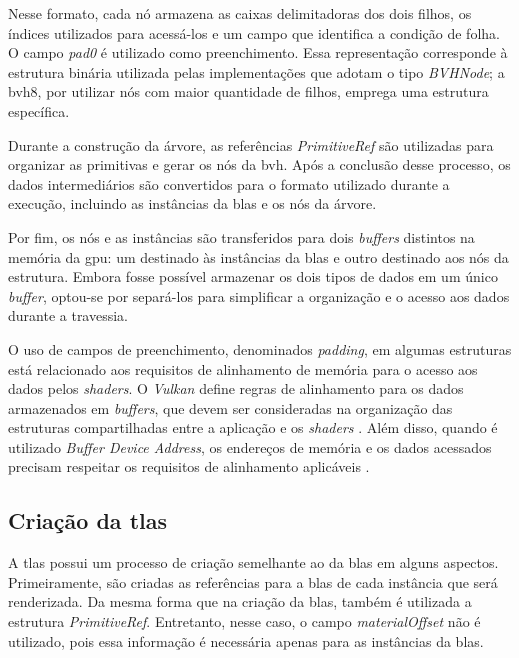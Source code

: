 Nesse formato, cada nó armazena as caixas delimitadoras dos dois filhos, os índices utilizados para acessá-los e um campo que identifica a condição de folha. O campo \textit{pad0} é utilizado como preenchimento. Essa representação corresponde à estrutura binária utilizada pelas implementações que adotam o tipo \textit{BVHNode}; a \gls{bvh8}, por utilizar nós com maior quantidade de filhos, emprega uma estrutura específica.

Durante a construção da árvore, as referências \textit{PrimitiveRef} são utilizadas para organizar as primitivas e gerar os nós da \gls{bvh}. Após a conclusão desse processo, os dados intermediários são convertidos para o formato utilizado durante a execução, incluindo as instâncias da \gls{blas} e os nós da árvore.

Por fim, os nós e as instâncias são transferidos para dois \textit{buffers} distintos na memória da \gls{gpu}: um destinado às instâncias da \gls{blas} e outro destinado aos nós da estrutura. Embora fosse possível armazenar os dois tipos de dados em um único \textit{buffer}, optou-se por separá-los para simplificar a organização e o acesso aos dados durante a travessia.

O uso de campos de preenchimento, denominados \textit{padding}, em algumas estruturas está relacionado aos requisitos de alinhamento de memória para o acesso aos dados pelos \textit{shaders}. O \textit{Vulkan} define regras de alinhamento para os dados armazenados em \textit{buffers}, que devem ser consideradas na organização das estruturas compartilhadas entre a aplicação e os \textit{shaders} \cite{vulkan_guide_shader_memory_layout}. Além disso, quando é utilizado \textit{Buffer Device Address}, os endereços de memória e os dados acessados precisam respeitar os requisitos de alinhamento aplicáveis \cite{vulkan_guide_bda_alignment}.

\subsection{Criação da \gls{tlas}}

A \gls{tlas} possui um processo de criação semelhante ao da \gls{blas} em alguns aspectos. Primeiramente, são criadas as referências para a \gls{blas} de cada instância que será renderizada. Da mesma forma que na criação da \gls{blas}, também é utilizada a estrutura \textit{PrimitiveRef}. Entretanto, nesse caso, o campo \textit{materialOffset} não é utilizado, pois essa informação é necessária apenas para as instâncias da \gls{blas}.


